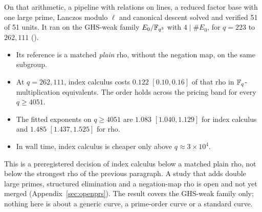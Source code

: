 On that arithmetic, a pipeline with relations on lines, a reduced factor base
with one large prime, Lanczos modulo $\ell$ and canonical descent solved and
verified 51 of 51 units. It ran on the GHS-weak family $E_0/\mathbb{F}_{q^3}$ with
$4\mid\#E_0$, for $q=223$ to $262{,}111$ ().
\begin{itemize}
  \item Its reference is a matched \emph{plain} rho, without the negation
    map, on the same subgroup.
  \item At $q=262{,}111$, index calculus costs $0.122$ $[0.10,0.16]$ of that
    rho in $\mathbb{F}_q$-multiplication equivalents. The order holds across the
    pricing band for every $q\ge4051$.
  \item The fitted exponents on $q\ge4051$ are $1.083$ $[1.040,1.129]$ for
    index calculus and $1.485$ $[1.437,1.525]$ for rho.
  \item In wall time, index calculus is cheaper only above $q\approx3\times10^4$.
\end{itemize}
This is a preregistered decision of index calculus below a matched plain rho,
not below the strongest rho of the previous paragraph. A study that adds
double large primes, structured elimination and a negation-map rho is open
and not yet merged (Appendix~\ref{sec:openprs}). The result covers the
GHS-weak family only; nothing here is about a generic curve, a prime-order
curve or a standard curve.

